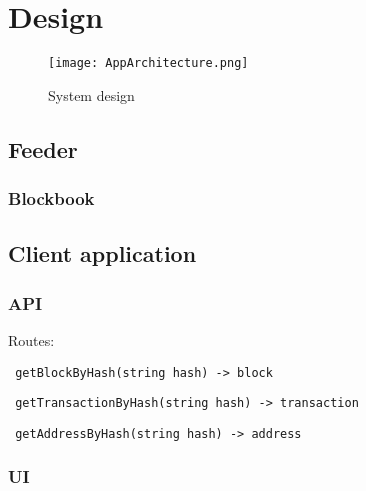 \chapter{Design}

\begin{figure}[H]
    \centering
    \texttt{[image: AppArchitecture.png]}
    \caption{System design}
    \label{}
\end{figure}

\section{Feeder}
\subsection{Blockbook}

\section{Client application}
\subsection{API}

Routes:

\texttt{ getBlockByHash(string hash) -> block } 

\texttt{ getTransactionByHash(string hash) -> transaction }

\texttt{ getAddressByHash(string hash) -> address }

\subsection{UI}
